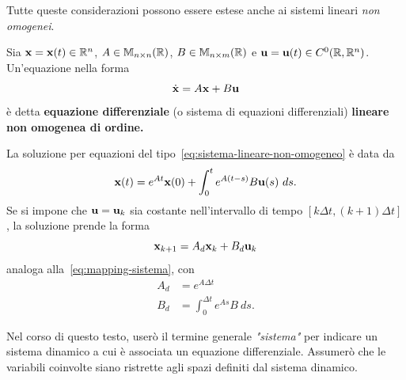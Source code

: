 Tutte queste considerazioni possono essere estese anche ai sistemi lineari
\emph{non omogenei}.


\begin{definition}
    Sia $\mathbf{x} = \mathbf{x}(t) \in \mathbb{R}^n$, $A \in \mathbb{M}_{n\times n}(\mathbb{R})$, $B \in \mathbb{M}_{n\times m}(\mathbb{R})$ e $\mathbf{u} = \mathbf{u}(t) \in C^0(\mathbb{R}, \mathbb{R}^n)$.
    Un'equazione nella forma
    \begin{equation}
        \dot{\mathbf{x}} = A \mathbf{x} + B \mathbf{u}
        \label{eq:sistema-lineare-non-omogeneo}
    \end{equation}
    è detta \textbf{equazione differenziale} (o sistema di equazioni differenziali) \textbf{lineare non omogenea di  ordine.}
    \label{def:sistema-lineare-non-omogeneo}
\end{definition}

La soluzione per equazioni del tipo~\eqref{eq:sistema-lineare-non-omogeneo} è data da
\begin{equation}
    \mathbf{x}(t) = e^{At} \mathbf{x}(0) + \int_{0}^{t} e^{A(t-s)} B \mathbf{u}(s) \ ds.
    \label{eq:soluzione-lineare-non-omogeneo}
\end{equation}
Se si impone che $\mathbf{u} = \mathbf{u}_k$ sia costante nell'intervallo di tempo $[k \Delta t, (k + 1)\Delta t]$,
la soluzione prende la forma
\begin{equation*}
    \mathbf{x}_{k+1} = A_d \mathbf{x}_k + B_d \mathbf{u}_k
\end{equation*}
analoga alla~\eqref{eq:mapping-sistema}, con
\begin{equation}
    \begin{aligned}
        A_d &= e^{A\Delta t} \\
        B_d &= \int_0^{\Delta t}e^{As} B\ ds.
    \end{aligned}
    \label{eq:bdequalsint}
\end{equation}

Nel corso di questo testo, userò il termine generale \emph{"sistema"} per indicare
un sistema dinamico a cui è associata un equazione differenziale. Assumerò che le variabili
coinvolte siano ristrette agli spazi definiti dal sistema dinamico.


